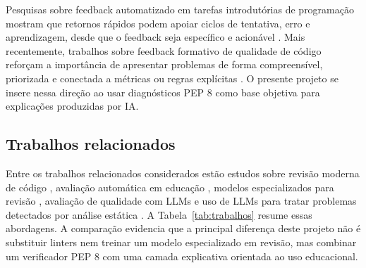 \documentclass[12pt]{article}
\begin{document}
Pesquisas sobre feedback automatizado em tarefas introdutórias de programação
mostram que retornos rápidos podem apoiar ciclos de tentativa, erro e
aprendizagem, desde que o feedback seja específico e acionável
\cite{singh2013feedback}. Mais recentemente, trabalhos sobre feedback formativo
de qualidade de código reforçam a importância de apresentar problemas de forma
compreensível, priorizada e conectada a métricas ou regras explícitas
\cite{vandenaker2024feedback}. O presente projeto se insere nessa direção ao
usar diagnósticos PEP 8 como base objetiva para explicações produzidas por IA.

\subsection{Trabalhos relacionados}

Entre os trabalhos relacionados considerados estão estudos sobre revisão moderna
de código \cite{bacchelli2013modernreview}, avaliação automática em educação
\cite{messer2024grading}, modelos especializados para revisão
\cite{li2022codereviewer}, avaliação de qualidade com LLMs
\cite{simoes2024llmquality} e uso de LLMs para tratar problemas detectados por
análise estática \cite{patcas2026llmquality}. A Tabela~\ref{tab:trabalhos}
resume essas abordagens. A comparação evidencia que a principal diferença deste
projeto não é substituir linters nem treinar um modelo especializado em revisão,
mas combinar um verificador PEP 8 com uma camada explicativa orientada ao uso
educacional.
\end{document}
